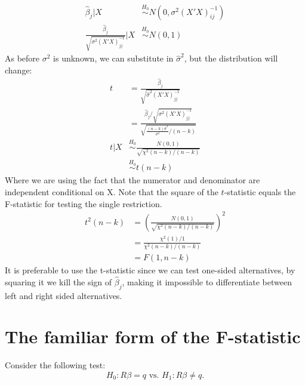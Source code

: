 \documentclass[DIV=14,titlepage=false]{scrreprt}
\begin{document}
\begin{align*}
\hat \beta_j|X &\overset{H_0}{\sim}N(0,\sigma^2(X'X)^{-1}_{ij})\\
\frac{\hat \beta_j}{\sqrt{\sigma^2(X'X)^{-1}_{jj}}}|X&\overset{H_0}{\sim}N(0,1)
\end{align*}
As before $\sigma^2$ is unknown, we can substitute in $\hat\sigma^2$, but the distribution will change:
\begin{align*}
t&=\frac{\hat\beta_j}{\sqrt{\hat\sigma^2(X'X)^{-1}_{jj}}}\\
 &= \frac{\hat\beta_j/{\sqrt{\sigma^2(X'X)^{-1}_{jj}}}}{\sqrt{\frac{(n-k)\hat\sigma^2}{\sigma^2}/(n-k)}}\\
 t|X &\overset{H_0}{\sim} \frac{N(0,1)}{\sqrt{\chi^2(n - k)/(n - k)}}\\
 &\overset{H_0}{\sim} t(n-k)
\end{align*}
Where we are using the fact that the numerator and denominator are independent conditional on X. Note that the square of the $t$-statistic equals the F-statistic for testing the single restriction.
\begin{align*}
t^2(n-k) &= \left(\frac{N(0,1)}{\sqrt{\chi^2(n - k)/(n - k)}}\right)^2\\
&= \frac{\chi^2(1)/1}{\chi^2(n - k)/(n - k)}\\
&= F(1,n-k)
\end{align*}
It is preferable to use the t-statistic since we can test one-sided alternatives, by squaring it we kill the sign of $\hat\beta_j$, making it impossible to differentiate between left and right sided alternatives.
\section{The familiar form of the F-statistic}
Consider the following test:\[ H_0: R\beta = q \text{ vs. } H_1: R\beta \not = q.\]
\end{document}
